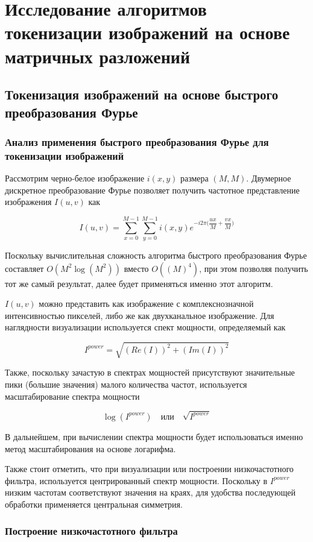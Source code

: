 \documentclass[times,specification,annotation]{itmo-student-thesis}
\begin{document}
\chapter{Исследование алгоритмов токенизации изображений на основе матричных разложений}

\section{Токенизация изображений на основе быстрого преобразования Фурье}

\subsection{Анализ применения быстрого преобразования Фурье для токенизации изображений}

Рассмотрим черно-белое изображение $i(x, y)$ размера $(M, M)$. Двумерное дискретное преобразование Фурье позволяет получить частотное представление изображения $I(u, v)$ как

$$
I(u, v) = \sum_{x=0}^{M-1}\sum_{y=0}^{M-1} i(x, y) e^{-i2\pi\Big(\dfrac{ux}{M} + \dfrac{vx}{M}\Big)}
$$

Поскольку вычислительная сложность алгоритма быстрого преобразования Фурье составляет $O(M^2 \log(M^2))$ вместо $O((M)^4)$, при этом позволяя получить тот же самый результат, далее будет применяться именно этот алгоритм. 

$I(u, v)$ можно представить как изображение с комплекснозначной интенсивностью пикселей, либо же как двухканальное изображение. Для наглядности визуализации используется спект мощности, определяемый как 

$$
I^{power} = \sqrt{(Re(I))^2 + (Im(I))^2}
$$

Также, поскольку зачастую в спектрах мощностей присутствуют значительные пики (большие значения) малого количества частот, используется масштабирование спектра мощности

$$
\log(I^{power}) \quad \text{или} \quad \sqrt{I^{power}}
$$

В дальнейшем, при вычислении спектра мощности будет использоваться именно метод масштабирования на основе логарифма.

Также стоит отметить, что при визуализации или построении низкочастотного фильтра, используется центрированный спектр мощности. Поскольку в $I^{power}$ низким частотам соответствуют значения на краях, для удобства последующей обработки применяется центральная симметрия.

\subsection{Построение низкочастотного фильтра}
\end{document}
